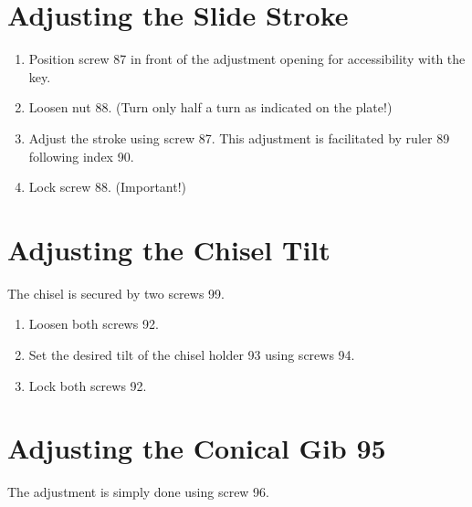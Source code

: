 \newpage

\section*{Adjusting the Slide Stroke}

\begin{enumerate}
    \item Position screw 87 in front of the adjustment opening for accessibility with the key.
    \item Loosen nut 88. (Turn only half a turn as indicated on the plate!)
    \item Adjust the stroke using screw 87. This adjustment is facilitated by ruler 89 following index 90.
    \item Lock screw 88. (Important!)
\end{enumerate}

\section*{Adjusting the Chisel Tilt}

The chisel is secured by two screws 99.

\begin{enumerate}
    \item Loosen both screws 92.
    \item Set the desired tilt of the chisel holder 93 using screws 94.
    \item Lock both screws 92.
\end{enumerate}

\section*{Adjusting the Conical Gib 95}

The adjustment is simply done using screw 96.
